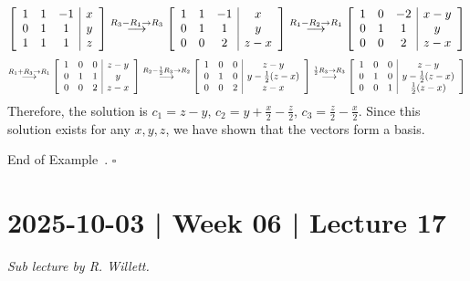 \documentclass[10pt]{article}
\newenvironment{augmentedmatrix}[1] %
{\left[\begin{array}{#1}}
    {\end{array}\right]}
\theoremstyle{definition}
\newtheorem{example}[theorem]{Example}
\renewenvironment{example}
{\begin{oldexample}}
  {\par\smallskip\hfill   End of Example~\theexample. $\square$    \par\end{oldexample}}
\begin{document}
\begin{example}
  \begin{equation}\label{eq:1}
    \begin{augmentedmatrix}{ccc|c}
      1&1&-1&x\\
      0&1&1&y\\
      1&1&1&z      
    \end{augmentedmatrix}
    \overset{R_{3}-R_{1}\to R_{3}}{\longrightarrow}
    \begin{augmentedmatrix}{ccc|c}
      1&1&-1&x\\
      0&1&1&y\\
      0&0&2&z-x      
    \end{augmentedmatrix}
    \overset{R_{1}-R_{2} \to R_{1}}{\longrightarrow}
    \begin{augmentedmatrix}{ccc|c}
      1&0&-2&x-y\\
      0&1&1&y\\
      0&0&2&z-x      
    \end{augmentedmatrix}
  \end{equation}
  \begin{equation*}
    \overset{R_{1}+R_{3} \to R_{1}}{\longrightarrow}
    \begin{augmentedmatrix}{ccc|c}
      1&0&0&z-y\\
      0&1&1&y\\
      0&0&2&z-x      
    \end{augmentedmatrix}
    \overset{R_{2}-\frac{1}{2}R_{3} \to R_{2}}{\longrightarrow}
    \begin{augmentedmatrix}{ccc|c}
      1&0&0&z-y\\
      0&1&0&y-\frac{1}{2}(z-x)\\
      0&0&2&z-x      
    \end{augmentedmatrix}
    \overset{\frac{1}{2}R_{3} \to R_{3}}{\longrightarrow}
    \begin{augmentedmatrix}{ccc|c}
      1&0&0&z-y\\
      0&1&0&y-\frac{1}{2}(z-x)\\
      0&0&1&\frac{1}{2}(z-x)
    \end{augmentedmatrix}
  \end{equation*}
  Therefore, the solution is $c_{1} =z-y$, $c_{2} =
  y+\frac{x}{2}-\frac{z}{2}$, $c_{3}= \frac{z}{2}-\frac{x}{2}$. Since this
  solution exists for any $x,y,z$, we have shown that the vectors form a basis.
\end{example}

\newpage
\section{2025-10-03 | Week 06 | Lecture 17}
\textit{Sub lecture by R. Willett.}
\end{document}
